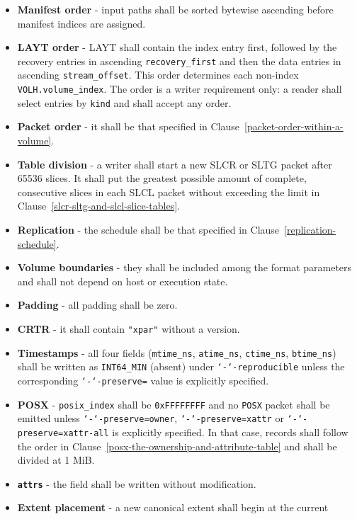 \documentclass[10pt,a4paper]{report}
\newcommand{\option}[1]{\texttt{\char`-\char`-#1}}
\begin{document}
\begin{itemize}
\item
  \textbf{Manifest order} - input paths shall be sorted bytewise ascending
  before manifest indices are assigned.
\item
  \textbf{LAYT order} - LAYT shall contain the index entry first, followed by
  the recovery entries in ascending \verb|recovery_first| and then the data
  entries in ascending \verb|stream_offset|. This order determines each
  non-index \verb|VOLH.volume_index|. The order is a writer requirement only:
  a reader shall select entries by \verb|kind| and shall accept any order.
\item
  \textbf{Packet order} - it shall be that specified in
  Clause~\ref{packet-order-within-a-volume}.
\item
  \textbf{Table division} - a writer shall start a new SLCR or SLTG packet
  after 65536 slices. It shall put the greatest possible amount of complete,
  consecutive slices in each SLCL packet without exceeding the limit in
  Clause~\ref{slcr-sltg-and-slcl-slice-tables}.
\item
  \textbf{Replication} - the schedule shall be that specified in
  Clause~\ref{replication-schedule}.
\item
  \textbf{Volume boundaries} - they shall be included among the format
  parameters and shall not depend on host or execution state.
\item
  \textbf{Padding} - all padding shall be zero.
\item
  \textbf{CRTR} - it shall contain \verb|"xpar"| without a version.
\item
  \textbf{Timestamps} - all four fields (\verb|mtime_ns|, \verb|atime_ns|,
  \verb|ctime_ns|, \verb|btime_ns|) shall be written as \verb|INT64_MIN|
  (absent) under \option{reproducible} unless the corresponding
  \option{preserve=} value is explicitly specified.
\item
  \textbf{POSX} - \verb|posix_index| shall be \verb|0xFFFFFFFF| and no
  \verb|POSX| packet shall be emitted unless \option{preserve=owner},
  \option{preserve=xattr} or \option{preserve=xattr-all} is explicitly
  specified. In that case, records shall follow the order in
  Clause~\ref{posx-the-ownership-and-attribute-table} and shall be divided at
  1 MiB.
\item
  \textbf{\texttt{attrs}} - the field shall be written without modification.
\item
  \textbf{Extent placement} - a new canonical extent shall begin at the current

\end{itemize}
\end{document}
